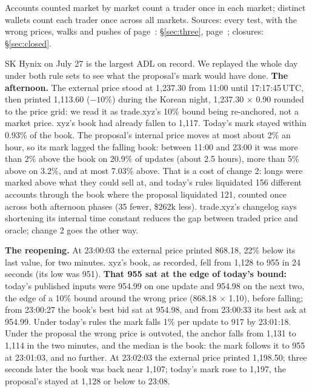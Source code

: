 \par{\small\color{mute}Accounts counted market by market count a trader once in each market; distinct wallets count each trader once across all markets. Sources: every test, with the wrong prices, walks and pushes of page~\pageref{sec:attacks}: \S\ref{sec:three}, page~\pageref{sec:three}; closures: \S\ref{sec:closed}.\par}

\label{sec:skhx}

SK Hynix on July 27 is the largest ADL on record. We replayed the whole day under both rule sets to see what the proposal's mark would have done. \textbf{The afternoon.} The external price stood at 1,237.30 from 11:00 until 17:17:45\,UTC, then printed 1,113.60 ($-10\%$) during the Korean night, 1,237.30 $\times$ 0.90 rounded to the price grid: we read it as trade.xyz's 10\% bound being re-anchored, not a market price. xyz's book had already fallen to 1,117. Today's mark stayed within 0.93\% of the book. The proposal's internal price moves at most about 2\% an hour, so its mark lagged the falling book: between 11:00 and 23:00 it was more than 2\% above the book on 20.9\% of updates (about 2.5 hours), more than 5\% above on 3.2\%, and at most 7.03\% above. That is a cost of change 2: longs were marked above what they could sell at, and today's rules liquidated 156 different accounts through the book where the proposal liquidated 121, counted once across both afternoon phases (35 fewer, \$262k less). trade.xyz's changelog says shortening its internal time constant reduces the gap between traded price and oracle; change 2 goes the other way.

\textbf{The reopening.} At 23:00:03 the external price printed 868.18, 22\% below its last value, for two minutes. xyz's book, as recorded, fell from 1,128 to 955 in 24 seconds (its low was 951). \textbf{That 955 sat at the edge of today's bound:} today's published inputs were 954.99 on one update and 954.98 on the next two, the edge of a 10\% bound around the wrong price (868.18 $\times$ 1.10), before falling; from 23:00:27 the book's best bid sat at 954.98, and from 23:00:33 its best ask at 954.99. Under today's rules the mark falls 1\% per update to 917 by 23:01:18. Under the proposal the wrong price is outvoted, the anchor falls from 1,131 to 1,114 in the two minutes, and the median is the book: the mark follows it to 955 at 23:01:03, and no further. At 23:02:03 the external price printed 1,198.50; three seconds later the book was back near 1,107; today's mark rose to 1,197, the proposal's stayed at 1,128 or below to 23:08.

